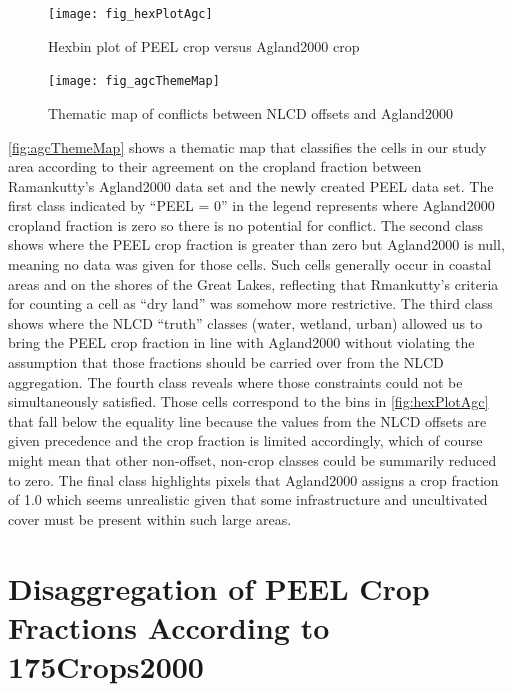 \begin{figure}[ht] 
  \centering

    \texttt{[image: fig\_hexPlotAgc]}
  \caption{Hexbin plot of PEEL crop versus Agland2000 crop}
  \label{fig:hexPlotAgc} 
\end{figure} 



\begin{figure} 
  \centering


    \texttt{[image: fig\_agcThemeMap]}
  \caption{Thematic map of conflicts between NLCD offsets and Agland2000}
  \label{fig:agcThemeMap} 
\end{figure} 


\autoref{fig:agcThemeMap} shows a thematic map that classifies the
cells in our study area according to their agreement on the cropland
fraction between Ramankutty's Agland2000 data set and the newly
created PEEL data set.  The first class indicated by ``PEEL = 0'' in
the legend represents where Agland2000 cropland fraction is zero so
there is no potential for conflict.  The second class shows where the
PEEL crop fraction is greater than zero but Agland2000 is null,
meaning no data was given for those cells.  Such cells generally occur
in coastal areas and on the shores of the Great Lakes, reflecting that
Rmankutty's criteria for counting a cell as ``dry land'' was somehow
more restrictive.  The third class shows where the NLCD ``truth''
classes (water, wetland, urban) allowed us to bring the PEEL crop
fraction in line with Agland2000 without violating the assumption that
those fractions should be carried over from the NLCD aggregation.  The
fourth class reveals where those constraints could not be
simultaneously satisfied.  Those cells correspond to the bins in
\autoref{fig:hexPlotAgc} that fall below the equality line because the
values from the NLCD offsets are given precedence and the crop
fraction is limited accordingly, which of course might mean that other
non-offset, non-crop classes could be summarily reduced to zero.  The
final class highlights pixels that Agland2000 assigns a crop fraction
of 1.0 which seems unrealistic given that some infrastructure and
uncultivated cover must be present within such large areas.

\section{Disaggregation of PEEL Crop Fractions According to 175Crops2000}
\label{sec:peel}





